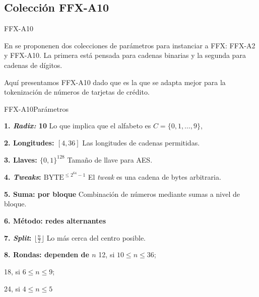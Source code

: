 %
%

\subsection{Colección FFX-A10}

\begin{frame}{FFX-A10}

  En \cite{ffx_2} se proponenen dos colecciones de parámetros para instanciar
  a FFX: FFX-A2 y FFX-A10. La primera está pensada para cadenas binarias y la
  segunda para cadenas de dígitos.

  Aquí presentamos FFX-A10 dado que es la que se adapta mejor para la
  tokenización de números de tarjetas de crédito.

\end{frame}

\begin{frame}{FFX-A10}{Parámetros}

  {
    \begin{block}{\textbf{1. \textit{Radix:} 10}}
      Lo que implica que el alfabeto es $ C = \{ 0, 1, \dots, 9 \} $,
    \end{block}

    \begin{block}{\textbf{2. Longitudes: $ [ 4, 36 ] $}}
      Las longitudes de cadenas permitidas.
    \end{block}

    \begin{block}{\textbf{3. Llaves: $ \{ 0, 1\}^{128} $}}
      Tamaño de llave para AES.
    \end{block}
  }

  {
    \begin{block}{\textbf{4. \textit{Tweaks}: $ \text{BYTE}^{\leq 2^{64} - 1} $}}
      El \textit{tweak} es una cadena de bytes arbitraria.
    \end{block}

    \begin{block}{\textbf{5. Suma: por bloque}}
      Combinación de números mediante sumas a nivel de bloque.
    \end{block}

    \begin{block}{\textbf{6. Método: redes alternantes}}
    \end{block}
  }

  {
    \begin{block}{\textbf{7. \textit{Split}: $ \lfloor \frac{n}{2} \rfloor $ }}
      Lo más cerca del centro posible.
    \end{block}

    \begin{block}{\textbf{8. Rondas: dependen de $ n $}}
      12, si $ 10 \leq n \leq 36 $; \par
      18, si $ 6 \leq n \leq 9 $; \par
      24, si $ 4 \leq n \leq 5 $
    \end{block}
  }

\end{frame}

